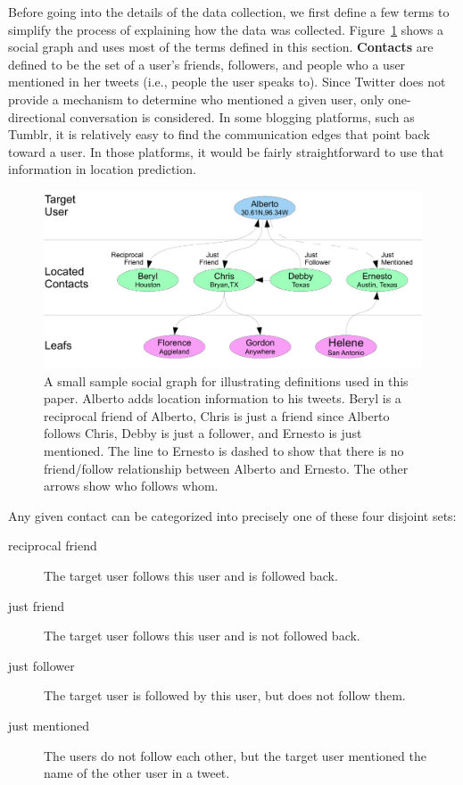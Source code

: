 


Before going into the details of the data collection, we first define a few
terms to simplify the process of explaining how the data was collected.
%
Figure~\ref{fig:Terms} shows a social graph and uses most of the terms
defined in this section.
%
\textbf{Contacts} are defined to be the set of a user's friends, followers, and
people who a user mentioned in her tweets (i.e., people the user speaks to).
%
Since Twitter does not provide a mechanism to determine who mentioned a given
user, only one-directional conversation is considered.
%
In some blogging platforms, such as Tumblr, it is relatively easy to find the
communication edges that point back toward a user.
%
In those platforms, it would be fairly straightforward to use that information
in location prediction.

\begin{figure}[tbh]
\centering
\includegraphics[width=\linewidth]{figures/terms.pdf}
\caption{
A small sample social graph for illustrating definitions used in this paper.
Alberto adds location information to his tweets.
Beryl is a reciprocal friend of Alberto, Chris is just a friend since Alberto
follows Chris, Debby is just a follower, and Ernesto is just mentioned.
The line to Ernesto is dashed to show that there is no friend/follow
relationship between Alberto and Ernesto.
The other arrows show who follows whom.
}
\label{fig:Terms}
\end{figure}

Any given contact can be categorized into precisely one of these four disjoint
sets:
\begin{description}
\item[reciprocal friend] The target user follows this user and is followed
    back.
\item[just friend] The target user follows this user and is not followed
    back.
\item[just follower] The target user is followed by this user, but does
    not follow them.
\item[just mentioned] The users do not follow each other, but the target
    user mentioned the name of the other user in a tweet.
\end{description}

